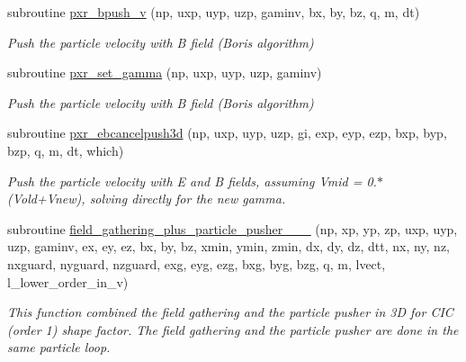 \begin{DoxyCompactItemize}
subroutine \hyperlink{particles__push_8_f90_a7ea5e15ca81ac196298e046dec12e3b9}{pxr\+\_\+bpush\+\_\+v} (np, uxp, uyp, uzp, gaminv, bx, by, bz, q, m, dt)
\begin{DoxyCompactList}\small\item\em Push the particle velocity with B field (Boris algorithm) \end{DoxyCompactList}\item 
subroutine \hyperlink{particles__push_8_f90_ad4471b8d19a27dc1e15683c68c2452d2}{pxr\+\_\+set\+\_\+gamma} (np, uxp, uyp, uzp, gaminv)
\begin{DoxyCompactList}\small\item\em Push the particle velocity with B field (Boris algorithm) \end{DoxyCompactList}\item 
subroutine \hyperlink{particles__push_8_f90_a4a0f739cde5e2d34dca78023a8b7145f}{pxr\+\_\+ebcancelpush3d} (np, uxp, uyp, uzp, gi, exp, eyp, ezp, bxp, byp, bzp, q, m, dt, which)
\begin{DoxyCompactList}\small\item\em Push the particle velocity with E and B fields, assuming Vmid = 0.$\ast$(Vold+\+Vnew), solving directly for the new gamma. \end{DoxyCompactList}\item 
subroutine \hyperlink{particles__push_8_f90_af9cba768132f6e7e5d6a39108c2c4118}{field\+\_\+gathering\+\_\+plus\+\_\+particle\+\_\+pusher\+\_\+\_\+\_} (np, xp, yp, zp, uxp, uyp, uzp, gaminv,                                                                                                                                                   ex, ey, ez, bx, by, bz, xmin, ymin, zmin,                                                                                                                                                           dx, dy, dz, dtt, nx, ny, nz, nxguard, nyguard, nzguard,                                                                                                                                                   exg, eyg, ezg, bxg, byg, bzg, q, m, lvect, l\+\_\+lower\+\_\+order\+\_\+in\+\_\+v)
\begin{DoxyCompactList}\small\item\em This function combined the field gathering and the particle pusher in 3D for C\+IC (order 1) shape factor. The field gathering and the particle pusher are done in the same particle loop. \end{DoxyCompactList}\item 

\end{DoxyCompactItemize}
